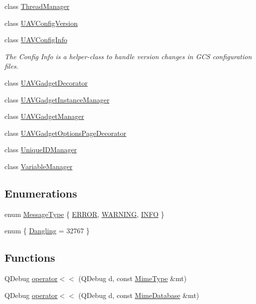 \begin{DoxyCompactItemize}
\item 
class \hyperlink{class_core_1_1_thread_manager}{\-Thread\-Manager}
\item 
class \hyperlink{class_core_1_1_u_a_v_config_version}{\-U\-A\-V\-Config\-Version}
\item 
class \hyperlink{class_core_1_1_u_a_v_config_info}{\-U\-A\-V\-Config\-Info}
\begin{DoxyCompactList}\small\item\em \-The \-Config \-Info is a helper-\/class to handle version changes in \-G\-C\-S configuration files. \end{DoxyCompactList}\item 
class \hyperlink{class_core_1_1_u_a_v_gadget_decorator}{\-U\-A\-V\-Gadget\-Decorator}
\item 
class \hyperlink{class_core_1_1_u_a_v_gadget_instance_manager}{\-U\-A\-V\-Gadget\-Instance\-Manager}
\item 
class \hyperlink{class_core_1_1_u_a_v_gadget_manager}{\-U\-A\-V\-Gadget\-Manager}
\item 
class \hyperlink{class_core_1_1_u_a_v_gadget_options_page_decorator}{\-U\-A\-V\-Gadget\-Options\-Page\-Decorator}
\item 
class \hyperlink{class_core_1_1_unique_i_d_manager}{\-Unique\-I\-D\-Manager}
\item 
class \hyperlink{class_core_1_1_variable_manager}{\-Variable\-Manager}
\end{DoxyCompactItemize}
\subsection*{\-Enumerations}
\begin{DoxyCompactItemize}
\item 
enum \hyperlink{group___core_plugin_ga51bd6651e9cc7b45aeaff9bd5991be3d}{\-Message\-Type} \{ \hyperlink{group___core_plugin_gga51bd6651e9cc7b45aeaff9bd5991be3da1b81696793f3033d6741d6b8a59ac60a}{\-E\-R\-R\-O\-R}, 
\hyperlink{group___core_plugin_gga51bd6651e9cc7b45aeaff9bd5991be3dae0a166ed923f101d89729bd68e2ddc37}{\-W\-A\-R\-N\-I\-N\-G}, 
\hyperlink{group___core_plugin_gga51bd6651e9cc7b45aeaff9bd5991be3dac2a21b18b6a15f19347c6f1401dad9b6}{\-I\-N\-F\-O}
 \}
\item 
enum \{ \hyperlink{group___core_plugin_gga53c997c04f0ea990d88ccbf1b5b98f8ca8312614a0b402ff5e3d6b897d3f84f18}{\-Dangling} =  32767
 \}
\end{DoxyCompactItemize}
\subsection*{\-Functions}
\begin{DoxyCompactItemize}
\item 
\-Q\-Debug \hyperlink{group___core_plugin_ga507400915fc308d3f7a295fd46aa8e8b}{operator$<$$<$} (\-Q\-Debug d, const \hyperlink{class_core_1_1_mime_type}{\-Mime\-Type} \&mt)
\item 
\-Q\-Debug \hyperlink{group___core_plugin_ga90cf57732d2c5688623991d6826ee082}{operator$<$$<$} (\-Q\-Debug d, const \hyperlink{class_core_1_1_mime_database}{\-Mime\-Database} \&mt)
\end{DoxyCompactItemize}


